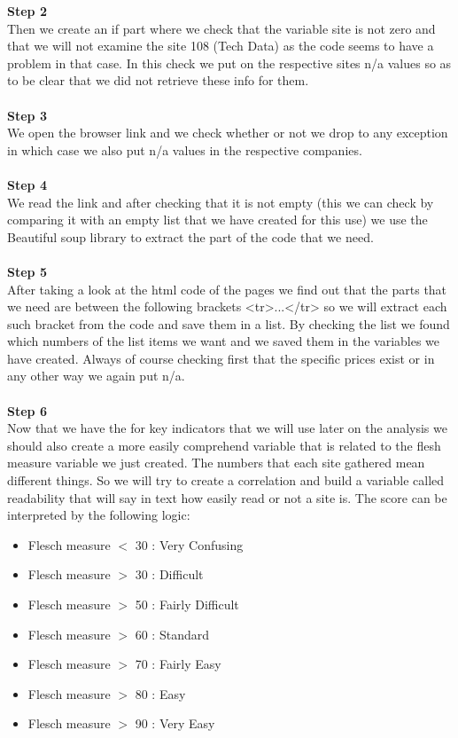 \documentclass{article}
\begin{document}
\textbf{Step 2} \\Then we create an if part where we check that the variable site is not zero and that we will not examine the site 108 (Tech Data) as the code seems to have a problem in that case. In this check we put on the respective sites n/a values so as to be clear that we did not retrieve these info for them.\\\\
\textbf{Step 3} \\We open the browser link and we check whether or not we drop to any exception in which case we also put n/a values in the respective companies.\\\\
\textbf{Step 4} \\We read the link and after checking that it is not empty (this we  can check by comparing it with an empty list that we have created for this use) we use the Beautiful soup library to extract the part of the code that we need.\\\\
\textbf{Step 5} \\After taking a look at the html code of the pages we find out that the parts that we need are between the following brackets <tr>...</tr> so we will extract each such bracket from the code and save them in a list. By checking the list we found which numbers of the list items we want and we saved them in the variables we have created. Always of course checking first that the specific prices exist or in any other way we again put n/a.\\\\
\textbf{Step 6} \\Now that we have the for key indicators that we will use later on the analysis we should also create a more easily comprehend variable that is related to the flesh measure variable we just created. The numbers that each site gathered mean different things. So we will try to create a correlation and build a variable called readability that will say in text how easily read or not a site is. The score can be interpreted by the following logic:
\begin{itemize}
\item Flesch measure $<$ 30 : Very Confusing
\item Flesch measure $>$ 30 : Difficult
\item Flesch measure $>$ 50 : Fairly Difficult
\item Flesch measure $>$ 60 : Standard
\item Flesch measure $>$ 70 : Fairly Easy
\item Flesch measure $>$ 80 : Easy
\item Flesch measure $>$ 90 : Very Easy
\end{itemize}
\end{document}
